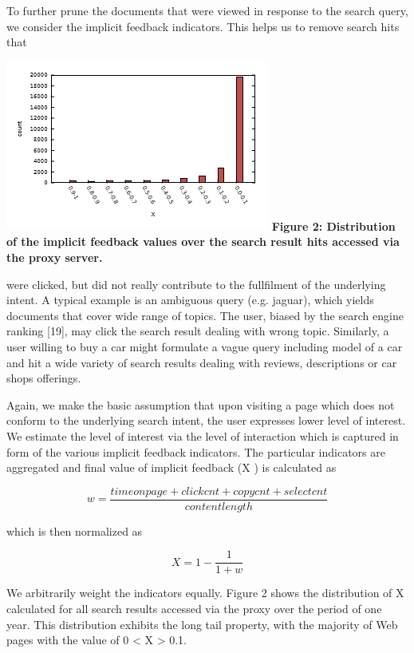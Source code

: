 \documentclass{acm_proc_article-sp} %
\begin{document}
To further prune the documents that were viewed in response
to the search query, we consider the implicit feedback
indicators. This helps us to remove search hits that

\includegraphics{Graph1.png}
\textbf{Figure 2: Distribution of the implicit feedback values over the search result hits accessed via the proxy server.}

were clicked, but did not really contribute to the fullfilment
of the underlying intent. A typical example is an ambiguous
query (e.g. jaguar), which yields documents that cover
wide range of topics. The user, biased by the search engine
ranking [19], may click the search result dealing with wrong
topic. Similarly, a user willing to buy a car might formulate
a vague query including model of a car and hit a wide variety
of search results dealing with reviews, descriptions or
car shops offerings.

Again, we make the basic assumption that upon visiting a
page which does not conform to the underlying search intent,
the user expresses lower level of interest. We estimate the
level of interest via the level of interaction which is captured
in form of the various implicit feedback indicators. The particular
indicators are aggregated and final value of implicit
feedback (X ) is calculated as

\begin{equation}w = \frac{time on page + click cnt + copy cnt + select cnt}{content length}\end{equation}

which is then normalized as

\begin{equation}X = 1 - \frac{1}{1 + w}\end{equation}

We arbitrarily weight the indicators equally. Figure 2 shows
the distribution of X calculated for all search results accessed
via the proxy over the period of one year. This distribution
exhibits the long tail property, with the majority
of Web pages with the value of 0 < X > 0.1.
\end{document}
